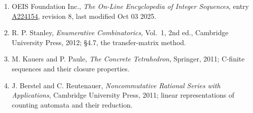 \documentclass[11pt]{article}
\theoremstyle{definition}
\begin{document}
\begin{enumerate}

\item OEIS Foundation Inc., \emph{The On-Line Encyclopedia of Integer Sequences}, entry \href{https://oeis.org/A224154}{A224154}, revision 8, last modified Oct 03 2025.

\item R. P. Stanley, \emph{Enumerative Combinatorics}, Vol.~1, 2nd ed., Cambridge University Press, 2012; \S4.7, the transfer-matrix method.

\item M. Kauers and P. Paule, \emph{The Concrete Tetrahedron}, Springer, 2011; C-finite sequences and their closure properties.

\item J. Berstel and C. Reutenauer, \emph{Noncommutative Rational Series with Applications}, Cambridge University Press, 2011; linear representations of counting automata and their reduction.

\end{enumerate}
\end{document}
